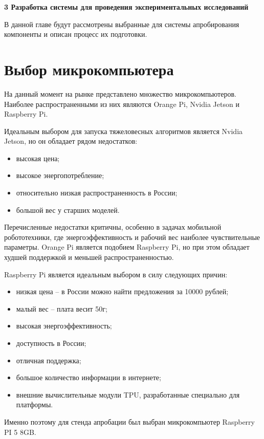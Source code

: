 \newpage
\begin{flushleft}
  \textbf{\large 3 Разработка системы для проведения экспериментальных исследований }
\end{flushleft}
В данной главе будут рассмотрены выбранные для системы апробирования компоненты и описан процесс их подготовки.

\section{Выбор микрокомпьютера}
На данный момент на рынке представлено множество микрокомпьютеров. Наиболее распространенными из них являются Orange Pi, Nvidia Jetson и Raspberry Pi. 

Идеальным выбором для запуска тяжеловесных алгоритмов является Nvidia Jetson, но он обладает рядом недостатков:
\begin{itemize}
  \item высокая цена;
  \item высокое энергопотребление;
  \item относительно низкая распространенность в России;
  \item большой вес у старших моделей.
\end{itemize}

Перечисленные недостатки критичны, особенно в задачах мобильной робототехники, где энергоэффективность и рабочий вес наиболее чувствительные параметры. 
Orange Pi является подобием Raspberry Pi, но при этом обладает худшей поддержкой и меньшей распространенностью. 

Raspberry Pi является идеальным выбором в силу следующих причин:
\begin{itemize}
  \item низкая цена -- в России можно найти предложения за 10000 рублей;
  \item малый вес -- плата весит 50г;
  \item высокая энергоэффективность;
  \item доступность в России;
  \item отличная поддержка;
  \item большое количество информации в интернете;
  \item внешние вычислительные модули TPU, разработанные специально для платформы. 
\end{itemize}

Именно поэтому для стенда апробации был выбран микрокомпьютер Raspberry PI 5 8GB.

